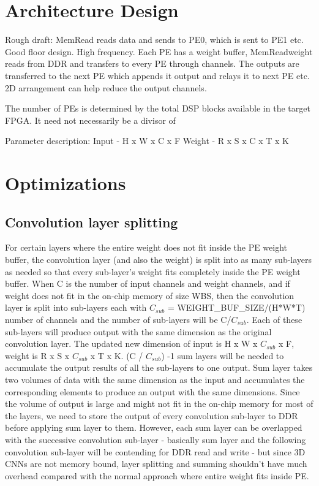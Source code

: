 \documentclass[conference]{IEEEtran}
\begin{document}
\section{Architecture Design}

Rough draft:
\newline
MemRead reads data and sends to PE0, which is sent to PE1 etc. Good floor design. High frequency. Each PE has a weight buffer, MemReadweight reads from DDR and transfers to every PE through channels. The outputs are transferred to the next PE which appends it output and relays it to next PE etc. 2D arrangement can help reduce the output channels.

The number of PEs is determined by the total DSP blocks available in the target FPGA. It need not necessarily be a divisor of 

Parameter description:
Input - H x W x C x F
Weight - R x S x C x T x K


\section{Optimizations}


\subsection{Convolution layer splitting}\label{AA}
For certain layers where the entire weight does not fit inside the PE weight buffer, the convolution layer (and also the weight) is split into as many sub-layers as needed so that every sub-layer’s weight fits completely inside the PE weight buffer. When C is the number of input channels and weight channels, and if weight does not fit in the on-chip memory of size WBS, then the convolution layer is split into sub-layers each with $C_{sub}$ = WEIGHT\_BUF\_SIZE/(H*W*T) number of channels and the number of sub-layers will be C/$C_{sub}$. Each of these sub-layers will produce output with the same dimension as the original convolution layer. The updated new dimension of input is H x W x $C_{sub}$ x F, weight is R x S x $C_{sub}$ x T x K. (C / $C_{sub}$) -1 sum layers will be needed to accumulate the output results of all the sub-layers to one output. Sum layer takes two volumes of data with the same dimension as the input and accumulates the corresponding elements to produce an output with the same dimensions. Since the volume of output is large and might not fit in the on-chip memory for most of the layers, we need to store the output of every convolution sub-layer to DDR before applying sum layer to them. However, each sum layer can be overlapped with the successive convolution sub-layer - basically sum layer and the following convolution sub-layer will be contending for DDR read and write - but since 3D CNNs are not memory bound, layer splitting and summing shouldn’t have much overhead compared with the normal approach where entire weight fits inside PE.
\end{document}
